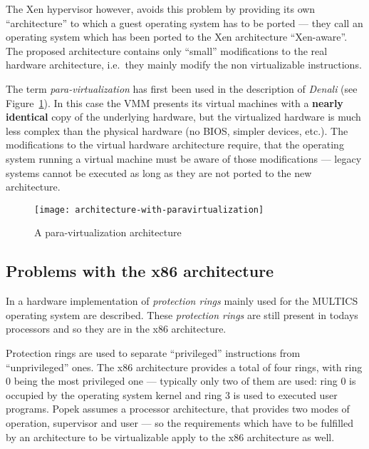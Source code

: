 The Xen  hypervisor \cite{xen} however,  avoids this problem  by providing
its  own ``architecture''  to which  a guest  operating system  has  to be
ported --- they call an operating  system which has been ported to the Xen
architecture  ``Xen-aware''.   The  proposed  architecture  contains  only
``small''  modifications  to  the  real hardware  architecture,  i.e.~they
mainly modify the non virtualizable instructions.

The term \emph{para-virtualization} has first been used in the description
of  \emph{Denali}  \cite{denali}  (see Figure~\ref{fig:arch-para-virt}).  In
this  case the  VMM presents  its virtual  machines with  a \textbf{nearly
  identical} copy of the underlying hardware, but the virtualized hardware
is much less complex than the physical hardware (no BIOS, simpler devices,
etc.).  The  modifications to  the virtual hardware  architecture require,
that the operating system running a virtual machine must be aware of those
modifications --- legacy  systems cannot be executed as  long as they are
not ported to the new architecture.

\begin{figure}[htbp]
  \begin{center}
    \begin{minipage}{0.75\textwidth}
      \begin{center}
        \texttt{[image: architecture-with-paravirtualization]}
      \end{center}
      \caption{A para-virtualization architecture}
      \label{fig:arch-para-virt}
    \end{minipage}
  \end{center}
\end{figure}

\subsection{Problems with the x86 architecture}
\label{sec:x86-problems}

In \cite{schroeder72} a hardware implementation of \emph{protection rings}
mainly  used  for  the  MULTICS  operating system  are  described.   These
\emph{protection rings} are still present in todays processors and so they
are in the x86 architecture.

Protection  rings are  used to  separate ``privileged''  instructions from
``unprivileged''  ones. The  x86  architecture provides  a  total of  four
rings, with ring 0 being the most privileged one --- typically only two of
them are used: ring 0 is  occupied by the operating system kernel and ring
3  is used  to executed  user  programs.  Popek  \cite{popek74} assumes  a
processor architecture,  that provides two modes  of operation, supervisor
and  user  --- so  the  requirements  which have  to  be  fulfilled by  an
architecture to be virtualizable apply to the x86 architecture as well.

